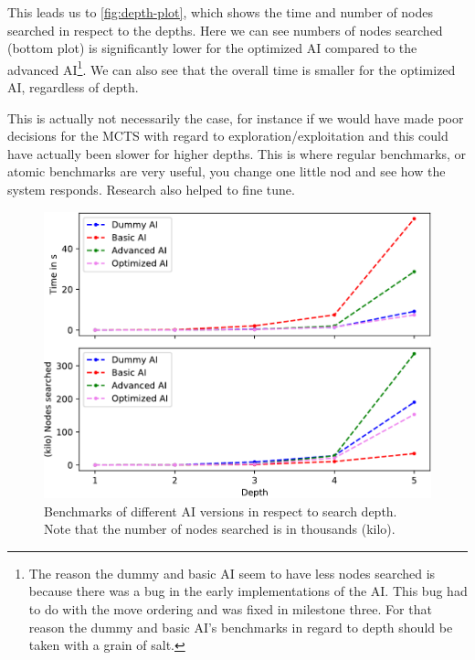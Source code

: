 \pagebreak

This leads us to \autoref{fig:depth-plot}, which shows
the time and number of nodes searched in respect to the
depths. Here we can see numbers of nodes searched (bottom plot) is significantly
lower for the optimized AI compared to the advanced AI\footnote{
The reason the dummy and basic AI seem to have less nodes searched
is because there was a bug in the early implementations of the AI.
This bug had to do with the move ordering and was fixed in milestone three.
For that reason the dummy and basic AI's benchmarks in regard to depth
should be taken with a grain of salt.
}. We can also see that the overall time is smaller for the optimized AI,
regardless of depth.

This is actually not necessarily the case,
for instance if we would have made poor decisions for the MCTS
with regard to exploration/exploitation and this could have actually been
slower for higher depths. This is where regular benchmarks, or atomic
benchmarks are very useful, you change one little nod and see how the
system responds. Research also helped to fine tune.

\begin{figure}[hbtp]
	\centering
	\includegraphics[width=.8\linewidth, page=1]{reference/pics/plot-depths.pdf}
	\captionsetup{justification=centering}
	\caption{Benchmarks of different AI versions in respect to search depth.\\Note that the number of nodes searched is in thousands (kilo).}
	\label{fig:depth-plot}
\end{figure}

\pagebreak
